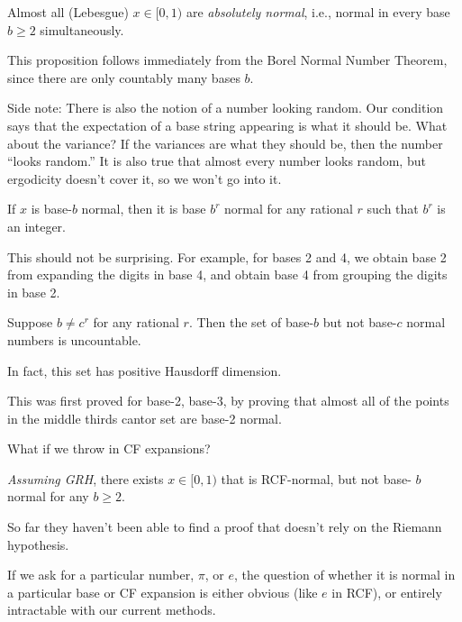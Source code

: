 \documentclass{article}
\begin{document}
\begin{proposition}
    Almost all (Lebesgue) $x\in [0,1)$ are \emph{absolutely normal},
    i.e., normal in every base $b\ge 2$ simultaneously.
\end{proposition}

This proposition follows immediately from the Borel Normal 
Number Theorem, since there are only countably many bases $b$.

Side note: There is also the notion of a number looking random.
Our condition says that the expectation of a base string appearing
is what it should be. What about the variance? If the variances
are what they should be, then the number ``looks random.''
It is also true that almost every number looks random, but 
ergodicity doesn't cover it, so we won't go into it.

\begin{proposition}
    If $x$ is base-$b$ normal, then it is base $b^r$ normal for 
    any rational $r$ such that $b^r$ is an integer.
\end{proposition}

This should not be surprising. For example, for bases 2 and 4,
we obtain base 2 from expanding the digits in base 4, 
and obtain base 4 from grouping the digits in base 2.

\begin{proposition}
    Suppose $b\ne c^r$ for any rational $r$. Then the set of 
    base-$b$ but not base-$c$ normal numbers is uncountable.
\end{proposition}

In fact, this set has positive Hausdorff dimension.

This was first proved for base-2, base-3, by proving that
almost all of the points in the middle thirds cantor set 
are base-2 normal.

What if we throw in CF expansions?

\begin{proposition}
    \emph{Assuming GRH},
    there exists $x\in [0,1)$ that is RCF-normal, but not base-
    $b$ normal for any $b\ge 2$.
\end{proposition}

So far they haven't been able to find a proof that doesn't rely on
the Riemann hypothesis.

If we ask for a particular number, $\pi$, or $e$, the question 
of whether it is normal in a particular base or CF expansion 
is either obvious (like $e$ in RCF), or entirely intractable
with our current methods.
\end{document}
